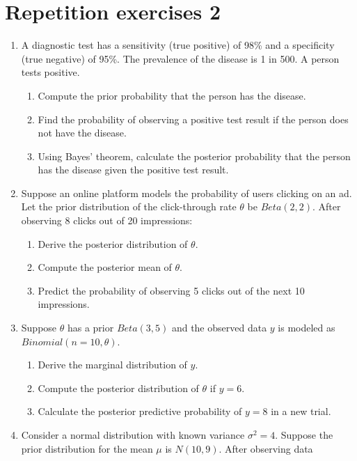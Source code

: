\documentclass[12pt,a4paper,twoside]{article}
\begin{document}
\section{Repetition exercises 2}
\begin{enumerate}
    \item A diagnostic test has a sensitivity (true positive) of 98\% and a specificity (true negative)
    of 95\%. The prevalence of the disease is 1 in 500. A person tests positive.
    \begin{enumerate}[label=\alph*)]
        \item Compute the prior probability that the person has the disease.
        \item Find the probability of observing a positive test result if the person does not have
        the disease.
        \item Using Bayes' theorem, calculate the posterior probability that the person has the
        disease given the positive test result.
    \end{enumerate}
    \item Suppose an online platform models the probability of users clicking on an ad. Let
    the prior distribution of the click-through rate $\theta$ be $Beta(2, 2)$. After observing
    8 clicks out of 20 impressions:
    \begin{enumerate}
        \item Derive the posterior distribution of $\theta$.
        \item Compute the posterior mean of $\theta$.
        \item Predict the probability of observing 5 clicks out of the next 10 impressions.
    \end{enumerate}
    \item Suppose $\theta$ has a prior $Beta(3, 5)$ and the observed data $y$ is modeled as 
    $Binomial(n = 10, \theta)$.
    \begin{enumerate}[label=\alph*)]
        \item Derive the marginal distribution of $y$.
        \item Compute the posterior distribution of $\theta$ if $y = 6$.
        \item Calculate the posterior predictive probability of $y = 8$ in a new trial.
    \end{enumerate}
    \item Consider a normal distribution with known variance $\sigma^2 = 4$. Suppose
    the prior distribution for the mean $\mu$ is $N(10, 9)$. After observing data

\end{enumerate}
\end{document}
